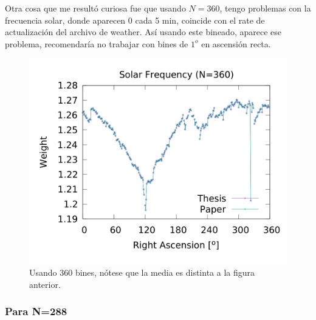 	Otra cosa que me resultó curiosa fue que usando $N=360$, tengo problemas con la frecuencia solar, donde aparecen 0 cada 5 min, coincide con el rate de actualización del archivo de weather. Así usando este bineado, aparece ese problema, recomendaría no trabajar con bines de $1^o$ en ascensión recta.
	\begin{figure}[H]
	\centering
	\includegraphics[width=\linewidth]{Graficos/solar_my_and_paper_in_360_2.png}
	\caption{Usando 360 bines, nótese que la media es distinta a la figura anterior.}
	\label{fig:solar_360}
	\end{figure}

	\subsubsection{Para N=288}

